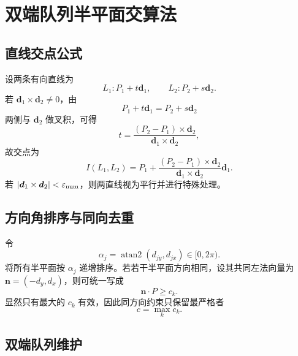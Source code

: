\documentclass[UTF8,12pt,a4paper]{ctexart}
\theoremstyle{definition}
\newcommand{\eps}{\varepsilon}
\newcommand{\abs}[1]{\left\lvert #1\right\rvert}
\newcommand{\cross}{\mathbin{\times}}
\begin{document}
\section{双端队列半平面交算法}

\subsection{直线交点公式}

设两条有向直线为
\begin{equation}
L_1:P_1+t\bm d_1,
\qquad
L_2:P_2+s\bm d_2.
\end{equation}
若 $\bm d_1\cross\bm d_2\neq0$，由
\[
P_1+t\bm d_1=P_2+s\bm d_2
\]
两侧与 $\bm d_2$ 做叉积，可得
\begin{equation}
t=
\frac{(P_2-P_1)\cross\bm d_2}
{\bm d_1\cross\bm d_2},
\end{equation}
故交点为
\begin{equation}
\boxed{
I(L_1,L_2)
=P_1+
\frac{(P_2-P_1)\cross\bm d_2}
{\bm d_1\cross\bm d_2}\bm d_1.
}
\label{eq:line-intersection}
\end{equation}
若 $\abs{\bm d_1\cross\bm d_2}<\eps_{\rm num}$，则两直线视为平行并进行特殊处理。

\subsection{方向角排序与同向去重}

令
\begin{equation}
\alpha_j=\operatorname{atan2}(d_{jy},d_{jx})\in[0,2\pi).
\end{equation}
将所有半平面按 $\alpha_j$ 递增排序。若若干半平面方向相同，设其共同左法向量为 $\bm n=(-d_y,d_x)$，则可统一写成
\begin{equation}
\bm n\cdot P\geq c_k.
\end{equation}
显然只有最大的 $c_k$ 有效，因此同方向约束只保留最严格者
\begin{equation}
c=\max_k c_k.
\end{equation}

\subsection{双端队列维护}
\end{document}
